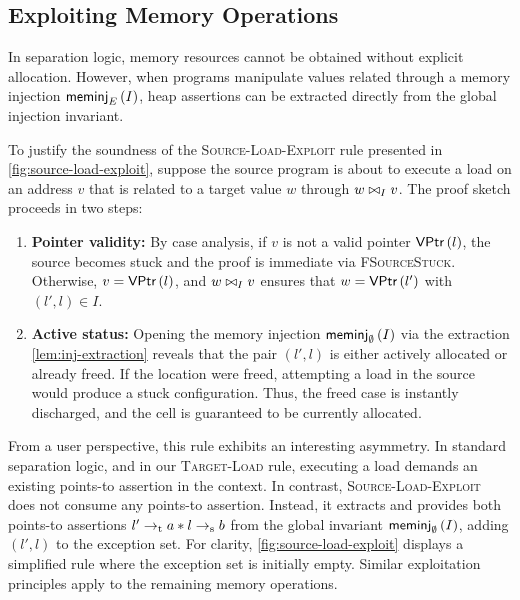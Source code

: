 \documentclass[report.tex]{subfiles}
\begin{document}
\subsection{Exploiting Memory Operations}

In separation logic,
memory resources cannot be obtained without explicit allocation.
However,
when programs manipulate values related through a memory injection
$\meminj{I}{E}$,
heap assertions can be extracted directly
from the global injection invariant.

To justify the soundness of the \textsc{Source-Load-Exploit} rule
presented in \cref{fig:source-load-exploit},
suppose the source program is about to execute a load on an address $v$
that is related to a target value $w$ through $\sameval{I}{w}{v}$.
The proof sketch proceeds in two steps:
\begin{enumerate}
  \item \textbf{Pointer validity:}
        By case analysis,
        if $v$ is not a valid pointer $\VPtr{l}$,
        the source becomes stuck
        and the proof is immediate via \textsc{FSourceStuck}.
        Otherwise,
        $v = \VPtr{l}$,
        and $\sameval{I}{w}{v}$ ensures that $w = \VPtr{l'}$
        with $(l', l) \in I$.
  \item \textbf{Active status:}
        Opening the memory injection $\meminj{I}{\emptyset}$
        via the extraction \cref{lem:inj-extraction}
        reveals that the pair $(l', l)$
        is either actively allocated or already freed.
        If the location were freed,
        attempting a load in the source would produce a stuck configuration.
        Thus,
        the freed case is instantly discharged,
        and the cell is guaranteed to be currently allocated.
\end{enumerate}

From a user perspective,
this rule exhibits an interesting asymmetry.
In standard separation logic,
and in our \textsc{Target-Load} rule,
executing a load demands an existing points-to assertion in the context.
In contrast,
\textsc{Source-Load-Exploit} does not consume any points-to assertion.
Instead,
it extracts and provides both points-to assertions
$\ptrt{l'}{a} \sep \ptrs{l}{b}$
from the global invariant $\meminj{I}{\emptyset}$,
adding $(l', l)$ to the exception set.
For clarity,
\cref{fig:source-load-exploit} displays a simplified rule
where the exception set is initially empty.
Similar exploitation principles apply to the remaining memory operations.
\end{document}
